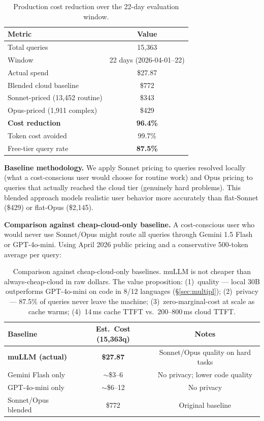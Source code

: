 \documentclass[11pt]{article}
\begin{document}
\begin{table}[t]
\centering
\small
\begin{tabular}{lc}
\toprule
\textbf{Metric} & \textbf{Value} \\
\midrule
Total queries & 15,363 \\
Window & 22 days (2026-04-01--22) \\
Actual spend & \$27.87 \\
Blended cloud baseline & \$772 \\
\quad Sonnet-priced (13,452 routine) & \$343 \\
\quad Opus-priced (1,911 complex) & \$429 \\
\textbf{Cost reduction} & \textbf{96.4\%} \\
Token cost avoided & 99.7\% \\
Free-tier query rate & \textbf{87.5\%} \\
\bottomrule
\end{tabular}
\caption{Production cost reduction over the 22-day evaluation window.}
\label{tab:cost}
\end{table}

\textbf{Baseline methodology.} We apply Sonnet pricing to queries
resolved locally (what a cost-conscious user would choose for routine
work) and Opus pricing to queries that actually reached the cloud tier
(genuinely hard problems). This blended approach models realistic user
behavior more accurately than flat-Sonnet (\$429) or flat-Opus (\$2,145).

\textbf{Comparison against cheap-cloud-only baseline.} A cost-conscious
user who would never use Sonnet/Opus might route all queries through
Gemini 1.5 Flash or GPT-4o-mini. Using April 2026 public pricing and a
conservative 500-token average per query:

\begin{table}[t]
\centering
\small
\begin{tabular}{lcc}
\toprule
\textbf{Baseline} & \textbf{Est.\ Cost (15,363q)} & \textbf{Notes} \\
\midrule
\textbf{muLLM (actual)} & \textbf{\$27.87} & Sonnet/Opus quality on hard tasks \\
Gemini Flash only & $\sim$\$3--6 & No privacy; lower code quality \\
GPT-4o-mini only & $\sim$\$6--12 & No privacy \\
Sonnet/Opus blended & \$772 & Original baseline \\
\bottomrule
\end{tabular}
\caption{Comparison against cheap-cloud-only baselines. muLLM is not
cheaper than always-cheap-cloud in raw dollars. The value proposition:
(1)~quality --- local 30B outperforms GPT-4o-mini on code in 8/12
languages (\S\ref{sec:multipl}); (2)~privacy --- 87.5\% of queries
never leave the machine; (3)~zero-marginal-cost at scale as cache
warms; (4)~14\,ms cache TTFT vs.\ 200--800\,ms cloud TTFT.}
\label{tab:cheapcloud}
\end{table}
\end{document}
